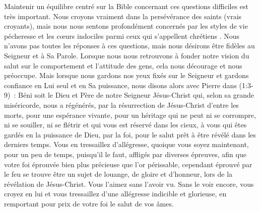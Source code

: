 \begin{enumerate}
\begin{specialpar}{}
Maintenir un équilibre centré sur la Bible concernant ces questions difficiles est très important.
 Nous croyons vraiment dans la persévérance des saints (vrais croyants),
 mais nous nous sentons profondément concernés par les styles de vie pécheresse
 et les cœurs indociles parmi ceux qui s'appellent \og chrétiens \fg{}.
 Nous n'avons pas toutes les réponses à ces questions,
 mais nous désirons être fidèles au Seigneur et à Sa Parole.
 Lorsque nous nous retrouvons à fonder notre vision du salut
 sur le comportement et l'attitude des gens, cela nous
 décourage et nous préoccupe.
 Mais lorsque nous gardons nos yeux fixés sur le Seigneur et gardons confiance en Lui seul
 et en Sa puissance, nous disons alors avec Pierre dans
 (1:3-9)~:
 \og Béni soit le Dieu et Père de notre Seigneur Jésus-Christ qui,
 selon sa grande miséricorde, nous a régénérés, par la résurrection
 de Jésus-Christ d'entre les morts, pour une espérance vivante,
 pour un héritage qui ne peut ni se corrompre, ni se souiller,
 ni se flétrir et qui vous est réservé dans les cieux,
 à vous qui êtes gardés en la puissance de Dieu, par la foi,
 pour le salut prêt à être révélé dans les derniers temps.
 Vous en tressaillez d'allégresse, quoique vous soyez maintenant,
 pour un peu de temps, puisqu'il le faut, affligés par diverses épreuves,
 afin que votre foi éprouvée \ocadr bien plus précieuse que l'or périssable,
 cependant éprouvé par le feu \fcadr{} se trouve être un sujet de louange,
 de gloire et d'honneur, lors de la révélation de Jésus-Christ.
 Vous l'aimez sans l'avoir vu. Sans le voir encore, vous croyez en lui
 et vous tressaillez d'une allégresse indicible et glorieuse,
 en remportant pour prix de votre foi le salut de vos âmes. \fg{}
\end{specialpar}


\end{enumerate}

